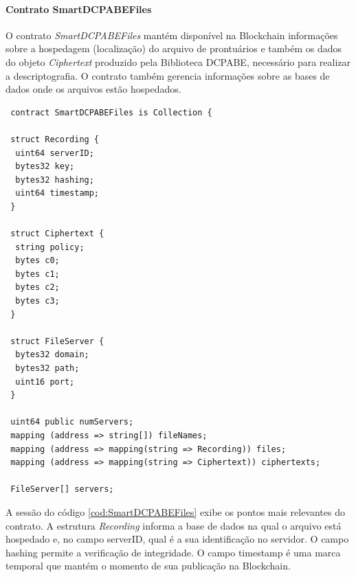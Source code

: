 \documentclass[a4paper,11pt]{article}
\begin{document}
\paragraph{Contrato SmartDCPABEFiles}



O contrato \emph{SmartDCPABEFiles} mantém disponível na Blockchain informações sobre a hospedagem (localização) do arquivo de prontuários e também os dados do objeto \emph{Ciphertext} produzido pela Biblioteca DCPABE, necessário para realizar a descriptografia. O contrato também gerencia informações sobre as bases de dados onde os arquivos estão hospedados.


\begin{lstlisting}
 contract SmartDCPABEFiles is Collection {

 struct Recording {
  uint64 serverID;
  bytes32 key;
  bytes32 hashing;
  uint64 timestamp;
 }

 struct Ciphertext {
  string policy;
  bytes c0;
  bytes c1;
  bytes c2;
  bytes c3;
 }

 struct FileServer {
  bytes32 domain;
  bytes32 path;
  uint16 port;
 }

 uint64 public numServers;
 mapping (address => string[]) fileNames;
 mapping (address => mapping(string => Recording)) files;
 mapping (address => mapping(string => Ciphertext)) ciphertexts;

 FileServer[] servers;
\end{lstlisting}


A sessão do código \ref{cod:SmartDCPABEFiles} exibe os pontos mais relevantes do contrato.
A estrutura \emph{Recording} informa a base de dados na qual o arquivo está hospedado e, no campo serverID, qual é a sua identificação no servidor.
O campo hashing permite a verificação de integridade. O campo timestamp é uma marca temporal que mantém o momento de sua publicação na Blockchain. %
\end{document}
